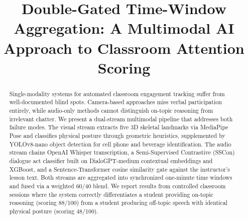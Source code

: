 \documentclass[conference]{IEEEtran}
\begin{document}
\title{Double-Gated Time-Window Aggregation: A Multimodal AI Approach to Classroom Attention Scoring}

\author{
\and
{}
\and
{}
}

\maketitle

\begin{abstract}
Single-modality systems for automated classroom engagement tracking suffer from well-documented blind spots. Camera-based approaches miss verbal participation entirely, while audio-only methods cannot distinguish on-topic reasoning from irrelevant chatter. We present a dual-stream multimodal pipeline that addresses both failure modes. The visual stream extracts five 3D skeletal landmarks via MediaPipe Pose and classifies physical posture through geometric heuristics, supplemented by YOLOv8-nano object detection for cell phone and beverage identification. The audio stream chains OpenAI Whisper transcription, a Semi-Supervised Contrastive (SSCon) dialogue act classifier built on DialoGPT-medium contextual embeddings and XGBoost, and a Sentence-Transformer cosine similarity gate against the instructor's lesson text. Both streams are aggregated into synchronized one-minute time windows and fused via a weighted 60/40 blend. We report results from controlled classroom sessions where the system correctly differentiates a student providing on-topic reasoning (scoring 88/100) from a student producing off-topic speech with identical physical posture (scoring 48/100).
\end{abstract}
\end{document}
